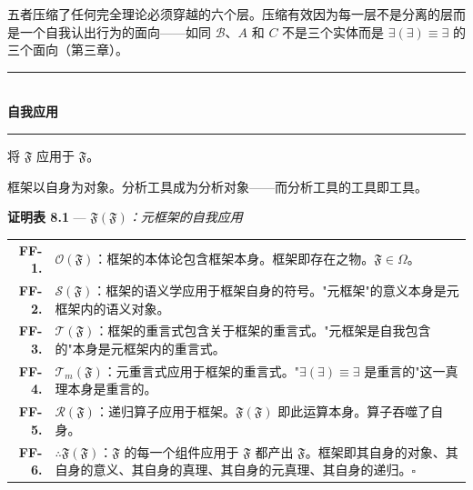 \documentclass[10pt, openany, oneside]{book}
\renewcommand{\normalsize}{\fontsize{10}{13}\selectfont}
\renewcommand{\footnotesize}{\fontsize{8.5}{11}\selectfont}
\begin{document}
\vspace{0.8em}

\noindent 五者压缩了任何完全理论必须穿越的六个层。压缩有效因为每一层不是分离的层而是一个自我认出行为的面向——如同 $\mathcal{B}$、$A$ 和 $C$ 不是三个实体而是 $\exists(\exists) \equiv \exists$ 的三个面向（第三章）。

\vspace{1.5em}


\begin{center}
    \rule{0.3\textwidth}{0.4pt}\\[0.5em]
    {\normalsize\bfseries\scshape 自我应用}\\[0.3em]
    \rule{0.3\textwidth}{0.4pt}
\end{center}

\vspace{1em}

\noindent 将 $\mathfrak{F}$ 应用于 $\mathfrak{F}$。

框架以自身为对象。分析工具成为分析对象——而分析工具的工具即工具。

\vspace{0.5em}

\textbf{证明表 8.1} --- \textit{$\mathfrak{F}(\mathfrak{F})$：元框架的自我应用}

\vspace{0.5em}

{\footnotesize
\noindent\begin{tabular}{r p{}}
\textbf{FF-1.} & $\mathcal{O}(\mathfrak{F})$：框架的本体论包含框架本身。框架即存在之物。$\mathfrak{F} \in \Omega$。\\[0.3em]
\textbf{FF-2.} & $\mathcal{S}(\mathfrak{F})$：框架的语义学应用于框架自身的符号。"元框架"的意义本身是元框架内的语义对象。\\[0.3em]
\textbf{FF-3.} & $\mathcal{T}(\mathfrak{F})$：框架的重言式包含关于框架的重言式。"元框架是自我包含的"本身是元框架内的重言式。\\[0.3em]
\textbf{FF-4.} & $\mathcal{T}_m(\mathfrak{F})$：元重言式应用于框架的重言式。"$\exists(\exists) \equiv \exists$ 是重言的"这一真理本身是重言的。\\[0.3em]
\textbf{FF-5.} & $\mathcal{R}(\mathfrak{F})$：递归算子应用于框架。$\mathfrak{F}(\mathfrak{F})$ 即此运算本身。算子吞噬了自身。\\[0.3em]
\textbf{FF-6.} & $\therefore \mathfrak{F}(\mathfrak{F})$：$\mathfrak{F}$ 的每一个组件应用于 $\mathfrak{F}$ 都产出 $\mathfrak{F}$。框架即其自身的对象、其自身的意义、其自身的真理、其自身的元真理、其自身的递归。$\square$ \\[0.3em]
\end{tabular}
}
\end{document}
